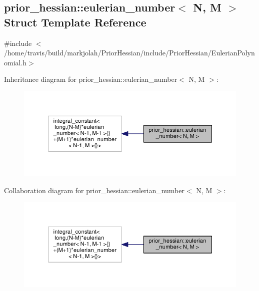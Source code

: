 \hypertarget{structprior__hessian_1_1eulerian__number}{}\subsection{prior\+\_\+hessian\+:\+:eulerian\+\_\+number$<$ N, M $>$ Struct Template Reference}
\label{structprior__hessian_1_1eulerian__number}


{\ttfamily \#include $<$/home/travis/build/markjolah/\+Prior\+Hessian/include/\+Prior\+Hessian/\+Eulerian\+Polynomial.\+h$>$}



Inheritance diagram for prior\+\_\+hessian\+:\+:eulerian\+\_\+number$<$ N, M $>$\+:\nopagebreak
\begin{figure}[H]
\begin{center}
\leavevmode
\includegraphics[width=347pt]{structprior__hessian_1_1eulerian__number__inherit__graph}
\end{center}
\end{figure}


Collaboration diagram for prior\+\_\+hessian\+:\+:eulerian\+\_\+number$<$ N, M $>$\+:\nopagebreak
\begin{figure}[H]
\begin{center}
\leavevmode
\includegraphics[width=347pt]{structprior__hessian_1_1eulerian__number__coll__graph}
\end{center}
\end{figure}


